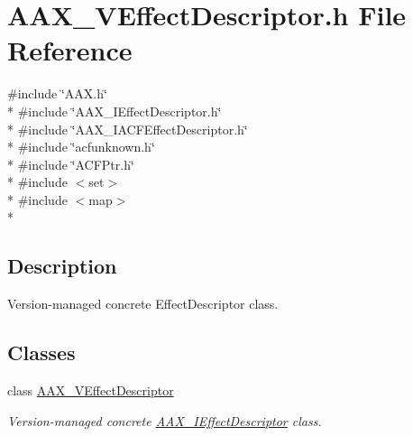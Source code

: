 \hypertarget{a00306}{}\section{A\+A\+X\+\_\+\+V\+Effect\+Descriptor.\+h File Reference}
\label{a00306}
{\ttfamily \#include \char`\"{}A\+A\+X.\+h\char`\"{}}\\*
{\ttfamily \#include \char`\"{}A\+A\+X\+\_\+\+I\+Effect\+Descriptor.\+h\char`\"{}}\\*
{\ttfamily \#include \char`\"{}A\+A\+X\+\_\+\+I\+A\+C\+F\+Effect\+Descriptor.\+h\char`\"{}}\\*
{\ttfamily \#include \char`\"{}acfunknown.\+h\char`\"{}}\\*
{\ttfamily \#include \char`\"{}A\+C\+F\+Ptr.\+h\char`\"{}}\\*
{\ttfamily \#include $<$set$>$}\\*
{\ttfamily \#include $<$map$>$}\\*


\subsection{Description}
Version-\/managed concrete Effect\+Descriptor class. 

\subsection*{Classes}
\begin{DoxyCompactItemize}
\item 
class \hyperlink{a00134}{A\+A\+X\+\_\+\+V\+Effect\+Descriptor}
\begin{DoxyCompactList}\small\item\em Version-\/managed concrete \hyperlink{a00096}{A\+A\+X\+\_\+\+I\+Effect\+Descriptor} class. \end{DoxyCompactList}\end{DoxyCompactItemize}
